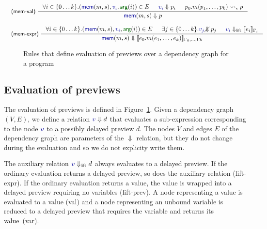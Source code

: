 \documentclass[acmsmall,anonymous,fleqn]{acmart}\settopmatter{printfolios=false,printccs=false,printacmref=false}
\theoremstyle{plain}
\theoremstyle{definition}
\newcommand{\ident}[1]{\textnormal{\textcolor{idclr}{\sffamily #1}}}
\newcommand{\bndclr}[1]{\textcolor{kvdclr}{#1}}
\newcommand{\bnd}[1]{\textnormal{\textcolor{kvdclr}{\sffamily #1}}}
\newcommand{\blbl}[1]{\textnormal{\textcolor{numclr}{\sffamily #1}}}
\newcommand{\rname}[1]{{\sffamily\small(#1)}}
\begin{document}
\begin{figure}[b]
\begin{equation*}
\begin{array}{l}
\\[0.5em]~
\end{array}
\end{equation*}
\begin{equation*}
\hspace{-2.5em}
\begin{array}{l}
\inference[\rname{mem-val}~]
  { \forall i\in\{0\ldots k\}.(\bnd{mem}(m, s), \bndclr{v_i}, \blbl{arg}(i)) \in E & \bndclr{v_i} \Downarrow p_i
    & p_0.m(p_1, \ldots, p_k) \rightsquigarrow_\epsilon p }
  { \bnd{mem}(m, s) \Downarrow p }
\\
\\
\inference[\rname{mem-expr}~]
  { \forall i\in\{0\ldots k\}.(\bnd{mem}(m, s), \bndclr{v_i}, \blbl{arg}(i)) \in E & \exists j\in\{0\ldots k\}.\bndclr{v_j}\diagup\hspace{-1em}\Downarrow p_j
   & \bndclr{v_i} \Downarrow_{\ident{lift}} \llbracket e_i \rrbracket_{\Gamma_i}  }
  { \bnd{mem}(m, s) \Downarrow \llbracket e_0.m(e_1, \ldots, e_k) \rrbracket_{\Gamma_0,\ldots,\Gamma k} }
\\
\end{array}
\end{equation*}

\caption{Rules that define evaluation of previews over a dependency graph for a program}
\label{fig:eval}
\end{figure}


\subsection{Evaluation of previews}
The evaluation of previews is defined in Figure~\ref{fig:eval}. Given a dependency graph $(V, E)$,
we define a relation $\bndclr{v}\Downarrow d$ that evaluates a sub-expression corresponding to
the node $\bndclr{v}$ to a possibly delayed preview $d$. The nodes $V$ and edges $E$ of the
dependency graph are parameters of the $\Downarrow$ relation, but they do not change during the
evaluation and so we do not explicity write them.

The auxiliary relation $\bndclr{v}\Downarrow_{\ident{lift}} d$ always evaluates
to a delayed preview. If the ordinary evaluation returns a delayed preview, so does the auxiliary
relation \rname{lift-expr}. If the ordinary evaluation returns a value, the value is wrapped
into a delayed preview requiring no variables \rname{lift-prev}.
%
A node representing a value is evaluated to a value \rname{val} and a node representing
an unbound variable is reduced to a delayed preview that requires the variable and returns its
value~\rname{var}.
\end{document}

